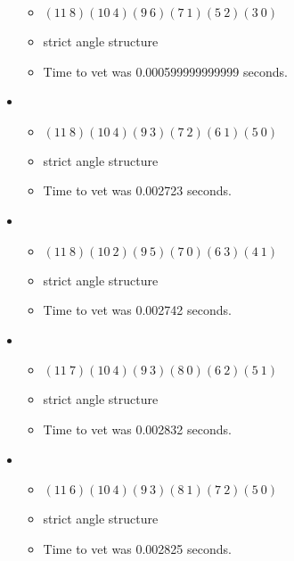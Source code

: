 \documentclass{article}
\begin{document}
\begin{itemize}
\begin{itemize}
      \item $(11\ 8)(10\ 4)(9\ 6)(7\ 1)(5\ 2)(3\ 0)$
      \item strict angle structure
      \item Time to vet was 0.000599999999999 seconds.
\end{itemize}
\item \begin{itemize}
      \item $(11\ 8)(10\ 4)(9\ 3)(7\ 2)(6\ 1)(5\ 0)$
      \item strict angle structure
      \item Time to vet was 0.002723 seconds.
\end{itemize}
\item \begin{itemize}
      \item $(11\ 8)(10\ 2)(9\ 5)(7\ 0)(6\ 3)(4\ 1)$
      \item strict angle structure
      \item Time to vet was 0.002742 seconds.
\end{itemize}
\item \begin{itemize}
      \item $(11\ 7)(10\ 4)(9\ 3)(8\ 0)(6\ 2)(5\ 1)$
      \item strict angle structure
      \item Time to vet was 0.002832 seconds.
\end{itemize}
\item \begin{itemize}
      \item $(11\ 6)(10\ 4)(9\ 3)(8\ 1)(7\ 2)(5\ 0)$
      \item strict angle structure
      \item Time to vet was 0.002825 seconds.
\end{itemize}
\end{itemize}
\end{document}
